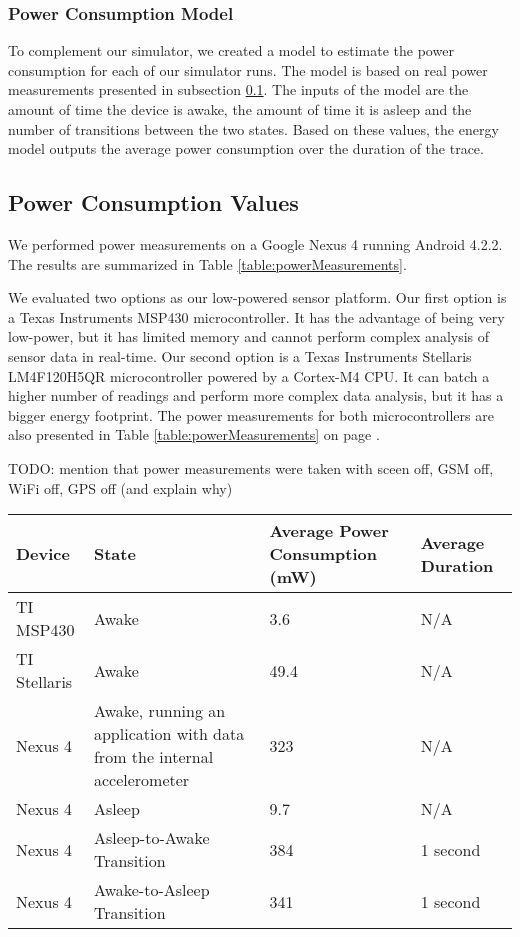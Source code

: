 \subsubsection{Power Consumption Model}

To complement our simulator, we created a model to estimate the power consumption for each of our simulator runs. The model is based on real power measurements presented in 
subsection \ref{subsec:power_consumption_values}. The inputs of the model are the amount 
of time the device is awake, the amount of time it is asleep and the number of transitions 
between the two states. Based on these values, the energy model outputs the
average power consumption over the duration of the trace.

\subsection{Power Consumption Values} \label{subsec:power_consumption_values}

We performed power measurements on a Google Nexus 4 running Android 4.2.2. The
results are summarized in Table \ref{table:powerMeasurements}. 

We evaluated two options as our low-powered sensor platform. Our first option is a Texas Instruments
MSP430 microcontroller. It has the advantage of being very low-power, but it has limited memory and
cannot perform complex analysis of sensor data in real-time. Our second option is a Texas Instruments
Stellaris LM4F120H5QR microcontroller powered by a Cortex-M4 CPU. It can batch a higher number of
readings and perform more complex data analysis, but it has a bigger energy footprint. The power
measurements for both microcontrollers are also presented in Table \ref{table:powerMeasurements} on page \pageref{table:powerMeasurements} .

TODO: mention that power measurements were taken with sceen off, GSM off, WiFi off, GPS off (and explain why) 
\begin{table*}[t]
\begin{tabular}{| l | p{7cm} | l | l |}
    \hline
    Device & State & Average Power Consumption (mW) & Average Duration \\ \hline
    TI MSP430 & Awake & 3.6 & N/A \\ \hline
    TI Stellaris & Awake & 49.4 & N/A \\ \hline
    Nexus 4 & Awake, running an application with data from the internal accelerometer & 323 & N/A \\ \hline
    Nexus 4 & Asleep & 9.7 & N/A \\ \hline
    Nexus 4 & Asleep-to-Awake Transition & 384 & 1 second \\ \hline
    Nexus 4 & Awake-to-Asleep Transition & 341 & 1 second \\ \hline
\end{tabular}
\caption{Power Measurements}
\label{table:powerMeasurements}
\end{table*}
    

